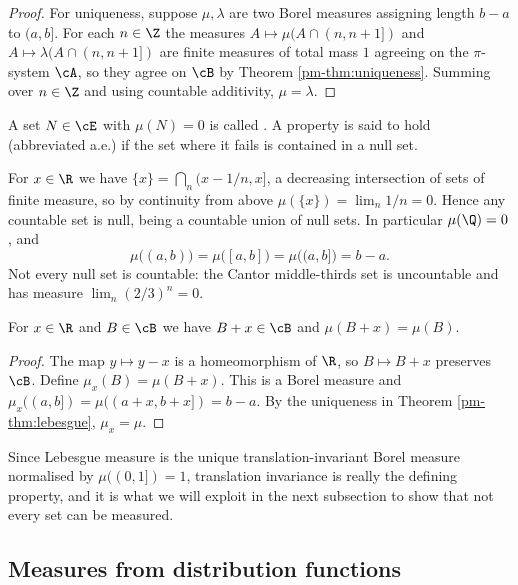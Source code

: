 \begin{proof}
	For uniqueness, suppose $\mu, \lambda$ are two Borel measures assigning length $b-a$ to $(a,b]$. For each $n \in \Z$ the measures $A \mapsto \mu(A \cap (n, n+1])$ and $A \mapsto \lambda(A \cap (n,n+1])$ are finite measures of total mass $1$ agreeing on the $\pi$-system $\cA$, so they agree on $\cB$ by Theorem \ref{pm-thm:uniqueness}. Summing over $n \in \Z$ and using countable additivity, $\mu = \lambda$.
\end{proof}

\begin{definition}
	A set $N \in \cE$ with $\mu(N) = 0$ is called . A property is said to hold  (abbreviated a.e.) if the set where it fails is contained in a null set.
\end{definition}

\begin{example}
	For $x \in \R$ we have $\{x\} = \bigcap_n (x - 1/n, x]$, a decreasing intersection of sets of finite measure, so by continuity from above $\mu(\{x\}) = \lim_n 1/n = 0$. Hence any countable set is null, being a countable union of null sets. In particular $\mu(\Q) = 0$, and
	$$
	\mu\big((a,b)\big) = \mu\big([a,b]\big) = \mu\big((a,b]\big) = b - a.
	$$
	Not every null set is countable: the Cantor middle-thirds set is uncountable and has measure $\lim_n (2/3)^n = 0$.
\end{example}

\begin{proposition}
	For $x \in \R$ and $B \in \cB$ we have $B + x \in \cB$ and $\mu(B+x) = \mu(B)$.
\end{proposition}
\begin{proof}
	The map $y \mapsto y - x$ is a homeomorphism of $\R$, so $B \mapsto B + x$ preserves $\cB$. Define $\mu_x(B) = \mu(B+x)$. This is a Borel measure and $\mu_x((a,b]) = \mu((a+x, b+x]) = b-a$. By the uniqueness in Theorem \ref{pm-thm:lebesgue}, $\mu_x = \mu$.
\end{proof}

Since Lebesgue measure is the unique translation-invariant Borel measure normalised by $\mu((0,1]) = 1$, translation invariance is really the defining property, and it is what we will exploit in the next subsection to show that not every set can be measured.

\subsection{Measures from distribution functions}

